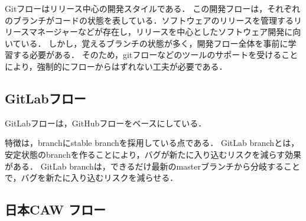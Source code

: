 Gitフローはリリース中心の開発スタイルである．
この開発フローは，それぞれのブランチがコードの状態を表している．ソフトウェアのリリースを管理するリリースマネージャーなどが存在し，リリースを中心としたソフトウェア開発に向いている．
しかし，覚えるブランチの状態が多く，開発フロー全体を事前に学習する必要がある．
そのため，gitフローなどのツールのサポートを受けることにより，強制的にフローからはずれない工夫が必要である\cite{ohtsuka2014}．


\subsection{GitLabフロー}


GitLabフローは，GitHubフローをベースにしている．


特徴は，branchにstable branchを採用している点である．
GitLab branchとは，安定状態のbranchを作ることにより，バグが新たに入り込むリスクを減らす効果がある．
GitLab branchは，できるだけ最新のmasterブランチから分岐することで，バグを新たに入り込むリスクを減らせる\cite{Nishimura2015}．



\subsection{日本CAW フロー}

